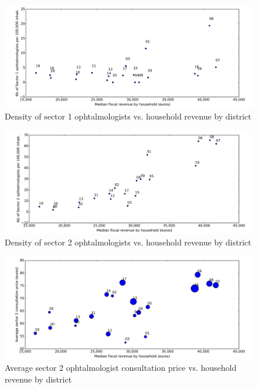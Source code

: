 \documentclass[11pt]{article}
\begin{document}
\begin{figure}[H]
    \caption{Density of sector 1 ophtalmologists vs. household revenue by district}
	\centering
		\includegraphics[width=16cm]{images/Ophtalmo_Ardt_DensityS1VsRevenue.png}
\end{figure}


\begin{figure}[H]
    \caption{Density of sector 2 ophtalmologists vs. household revenue by district}
	\centering
		\includegraphics[width=16cm]{images/Ophtalmo_Ardt_DensityS2VsRevenue.png}
\end{figure}

\begin{figure}[H]
    \caption{Average sector 2 ophtalmologist consultation price vs. household revenue by district}
	\centering
		\includegraphics[width=16cm]{images/Ophtalmo_Ardt_ConsultationS2VsRevenue.png}
\end{figure}

\clearpage

\appendix
\end{document}
